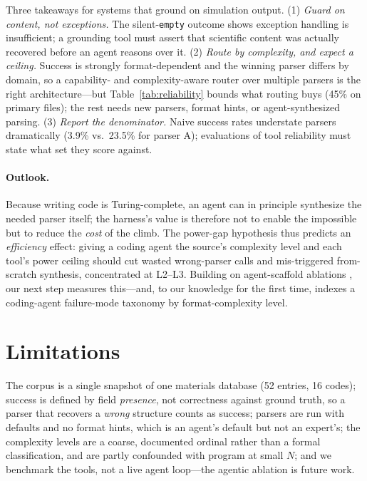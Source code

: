 \documentclass{article}
\begin{document}
Three takeaways for systems that ground on simulation output. (1) \emph{Guard on
content, not exceptions.} The silent-\texttt{empty} outcome shows exception
handling is insufficient; a grounding tool must assert that scientific content was
actually recovered before an agent reasons over it. (2) \emph{Route by complexity,
and expect a ceiling.} Success is strongly format-dependent and the winning parser
differs by domain, so a capability- and complexity-aware router over multiple
parsers is the right architecture---but Table~\ref{tab:reliability} bounds what
routing buys (45\% on primary files); the rest needs new parsers, format hints, or
agent-synthesized parsing. (3) \emph{Report the denominator.} Naive success rates
understate parsers dramatically (3.9\% vs.\ 23.5\% for parser A); evaluations of
tool reliability must state what set they score against.

\paragraph{Outlook.} Because writing code is Turing-complete, an agent can in
principle synthesize the needed parser itself; the harness's value is therefore not
to enable the impossible but to reduce the \emph{cost} of the climb. The power-gap
hypothesis thus predicts an \emph{efficiency} effect: giving a coding agent the
source's complexity level and each tool's power ceiling should cut wasted
wrong-parser calls and mis-triggered from-scratch synthesis, concentrated at
L2--L3. Building on agent-scaffold ablations \citep{sweagent}, our next step
measures this---and, to our knowledge for the first time, indexes a coding-agent
failure-mode taxonomy by format-complexity level.

\section*{Limitations}

The corpus is a single snapshot of one materials database (52 entries, 16 codes);
success is defined by field \emph{presence}, not correctness against ground truth,
so a parser that recovers a \emph{wrong} structure counts as success; parsers are
run with defaults and no format hints, which is an agent's default but not an
expert's; the complexity levels are a coarse, documented ordinal rather than a
formal classification, and are partly confounded with program at small $N$; and we
benchmark the tools, not a live agent loop---the agentic ablation is future work.

{\small


}
\end{document}
